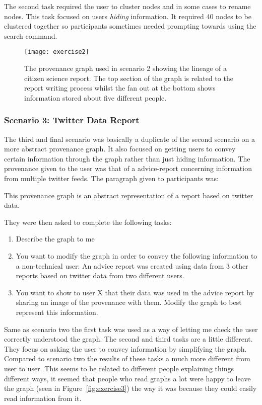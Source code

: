 The second task required the user to cluster nodes and in some cases to rename nodes. This task focused on users \textit{hiding} information. It required 40 nodes to be clustered together so participants sometimes needed prompting towards using the search command. 

\begin{figure}[h]
	\centering
	\texttt{[image: exercise2]}
	\caption{The provenance graph used in scenario 2 showing the lineage of a citizen science report. The top section of the graph is related to the report writing process whilst the fan out  at the bottom shows information stored about five different people.}
	\label{fig:exercise2}
\end{figure}


\subsubsection{Scenario 3: Twitter Data Report}
\label{ssub:Scenario 3: Twitter Data Report}

The third and final scenario was basically a duplicate of the second scenario on a more abstract provenance graph. It also focused on getting users to convey certain information through the graph rather than just hiding information. The provenance given to the user was that of a advice-report concerning information from multiple twitter feeds. The paragraph given to participants was: 

\begin{framed}
This provenance graph is an abstract representation of a report based on twitter data. 
\end{framed}

They were then asked to complete the following tasks:

\begin{enumerate}
	\item Describe the graph to me
	\item You want to modify the graph in order to convey the following information to a non-technical user: An advice report was created using data from 3 other reports based on twitter data from two different users. 
	\item You want to show to user X that their data was used in the advice report by sharing an image of the provenance with them. Modify the graph to best represent this information. 
\end{enumerate}

Same as scenario two the first task was used as a way of letting me check the user correctly understood the graph. The second and third tasks are a little different. They focus on asking the user to convey information by simplifying the graph. Compared to scenario two the results of these tasks a much more different from user to user. This seems to be related to different people explaining things different ways, it seemed that people who read graphs a lot were happy to leave the graph (seen in Figure~\ref{fig:exercise3}) the way it was because they could easily read information from it. 

